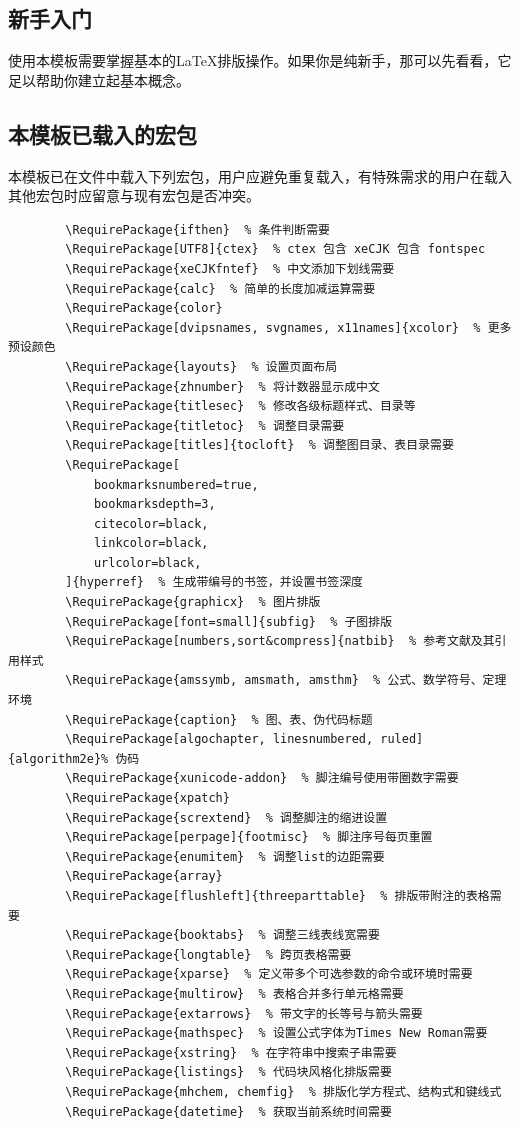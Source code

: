 \documentclass[QingNianC, vlined, timesmathnogreek]{nsfc}
\begin{document}
	\subsection{新手入门}

	使用本模板需要掌握基本的LaTeX排版操作。如果你是纯新手，那可以先看看\href{https://ctan.math.utah.edu/ctan/tex-archive/info/lshort/chinese/lshort-zh-cn.pdf}{\bfseries\color{DarkRed}}，它足以帮助你建立起基本概念。


	\subsection{本模板已载入的宏包}

	本模板已在文件中载入下列宏包，用户应避免重复载入，有特殊需求的用户在载入其他宏包时应留意与现有宏包是否冲突。

	\begin{verbatim}
		\RequirePackage{ifthen}  % 条件判断需要
		\RequirePackage[UTF8]{ctex}  % ctex 包含 xeCJK 包含 fontspec
		\RequirePackage{xeCJKfntef}  % 中文添加下划线需要
		\RequirePackage{calc}  % 简单的长度加减运算需要
		\RequirePackage{color}
		\RequirePackage[dvipsnames, svgnames, x11names]{xcolor}  % 更多预设颜色
		\RequirePackage{layouts}  % 设置页面布局
		\RequirePackage{zhnumber}  % 将计数器显示成中文
		\RequirePackage{titlesec}  % 修改各级标题样式、目录等
		\RequirePackage{titletoc}  % 调整目录需要
		\RequirePackage[titles]{tocloft}  % 调整图目录、表目录需要
		\RequirePackage[
		    bookmarksnumbered=true,
		    bookmarksdepth=3,
		    citecolor=black,
		    linkcolor=black,
		    urlcolor=black,
		]{hyperref}  % 生成带编号的书签，并设置书签深度
		\RequirePackage{graphicx}  % 图片排版
		\RequirePackage[font=small]{subfig}  % 子图排版
		\RequirePackage[numbers,sort&compress]{natbib}  % 参考文献及其引用样式
		\RequirePackage{amssymb, amsmath, amsthm}  % 公式、数学符号、定理环境
		\RequirePackage{caption}  % 图、表、伪代码标题
		\RequirePackage[algochapter, linesnumbered, ruled]{algorithm2e}% 伪码
		\RequirePackage{xunicode-addon}  % 脚注编号使用带圈数字需要
		\RequirePackage{xpatch}
		\RequirePackage{scrextend}  % 调整脚注的缩进设置
		\RequirePackage[perpage]{footmisc}  % 脚注序号每页重置
		\RequirePackage{enumitem}  % 调整list的边距需要
		\RequirePackage{array}
		\RequirePackage[flushleft]{threeparttable}  % 排版带附注的表格需要
		\RequirePackage{booktabs}  % 调整三线表线宽需要
		\RequirePackage{longtable}  % 跨页表格需要
		\RequirePackage{xparse}  % 定义带多个可选参数的命令或环境时需要
		\RequirePackage{multirow}  % 表格合并多行单元格需要
		\RequirePackage{extarrows}  % 带文字的长等号与箭头需要
		\RequirePackage{mathspec}  % 设置公式字体为Times New Roman需要
		\RequirePackage{xstring}  % 在字符串中搜索子串需要
		\RequirePackage{listings}  % 代码块风格化排版需要
		\RequirePackage{mhchem, chemfig}  % 排版化学方程式、结构式和键线式
		\RequirePackage{datetime}  % 获取当前系统时间需要
	\end{verbatim}
	
\end{document}
